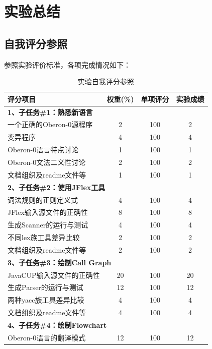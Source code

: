 \chapter{实验总结}

\section{自我评分参照}

参照实验评价标准，各项完成情况如下：

\begin{table}[htbp]
    \centering
    \caption{实验自我评分参照}
    \label{tab:self-eval}
    \begin{tabular}{|p{5.5cm}|c|c|c|}
    \hline
    \textbf{评分项目} & \textbf{权重(\%)} & \textbf{单项评分} & \textbf{实验成绩} \\
    \hline
    \multicolumn{4}{|l|}{\textbf{1、子任务\#1：熟悉新语言}} \\
    \quad 一个正确的Oberon-0源程序 & 2 & 100 & 2 \\
    \quad 变异程序 & 4 & 100 & 4 \\
    \quad Oberon-0语言特点讨论 & 1 & 100 & 1 \\
    \quad Oberon-0文法二义性讨论 & 2 & 100 & 2 \\
    \quad 文档组织及readme文件等 & 1 & 100 & 1 \\
    \hline
    \multicolumn{4}{|l|}{\textbf{2、子任务\#2：使用JFlex工具}} \\
    \quad 词法规则的正则定义式 & 4 & 100 & 4 \\
    \quad JFlex输入源文件的正确性 & 8 & 100 & 8 \\
    \quad 生成Scanner的运行与测试 & 4 & 100 & 4 \\
    \quad 不同lex族工具差异比较 & 2 & 100 & 2 \\
    \quad 文档组织及readme文件等 & 2 & 100 & 2 \\
    \hline
    \multicolumn{4}{|l|}{\textbf{3、子任务\#3：绘制Call Graph}} \\
    \quad JavaCUP输入源文件的正确性 & 20 & 100 & 20 \\
    \quad 生成Parser的运行与测试 & 12 & 100 & 12 \\
    \quad 两种yacc族工具差异比较 & 4 & 100 & 4 \\
    \quad 文档组织及readme文件等 & 4 & 100 & 4 \\
    \hline
    \multicolumn{4}{|l|}{\textbf{4、子任务\#4：绘制Flowchart}} \\
    \quad Oberon-0语言的翻译模式 & 12 & 100 & 12 \\

\end{tabular}
\end{table}
